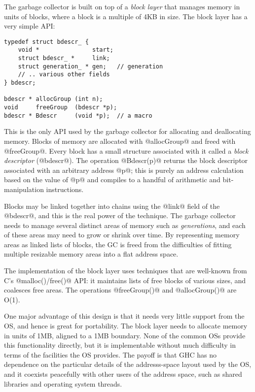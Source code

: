 \documentclass{article}
\begin{document}
The garbage collector is built on top of a \emph{block layer} that
manages memory in units of blocks, where a block is a multiple of 4KB
in size.  The block layer has a very simple API:

\begin{verbatim}
typedef struct bdescr_ {
    void *               start;
    struct bdescr_ *     link;
    struct generation_ * gen;   // generation
    // .. various other fields
} bdescr;

bdescr * allocGroup (int n);
void     freeGroup  (bdescr *p);
bdescr * Bdescr     (void *p);  // a macro
\end{verbatim}

This is the only API used by the garbage collector for allocating and
deallocating memory.  Blocks of memory are allocated with @allocGroup@
and freed with @freeGroup@.  Every block has a small structure
associated with it called a \emph{block descriptor} (@bdescr@).  The
operation @Bdescr(p)@ returns the block descriptor associated with an
arbitrary address @p@; this is purely an address calculation based on
the value of @p@ and compiles to a handful of arithmetic and
bit-manipulation instructions.

Blocks may be linked together into chains using the @link@ field of
the @bdescr@, and this is the real power of the technique.  The
garbage collector needs to manage several distinct areas of memory
such as \emph{generations}, and each of these areas may need to grow
or shrink over time.  By representing memory areas as linked lists of
blocks, the GC is freed from the difficulties of fitting multiple
resizable memory areas into a flat address space.

The implementation of the block layer uses techniques that are
well-known from C's @malloc()/free()@ API: it maintains lists of free
blocks of various sizes, and coalesces free areas.  The operations
@freeGroup()@ and @allocGroup()@ are O(1).

One major advantage of this design is that it needs very little
support from the OS, and hence is great for portability.  The block
layer needs to allocate memory in units of 1MB, aligned to a 1MB
boundary.  None of the common OSs provide this functionality directly,
but it is implementable without much difficulty in terms of the
facilities the OS provides.  The payoff is that GHC has no dependence
on the particular details of the addresss-space layout used by the OS,
and it coexists peacefully with other users of the address space, such
as shared libraries and operating system threads.
\end{document}
